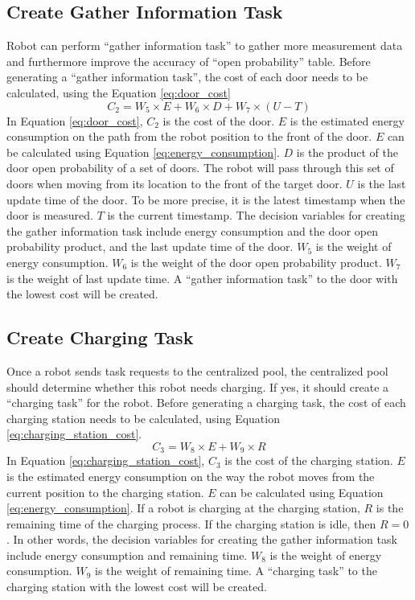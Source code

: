 \subsection{Create Gather Information Task}
\label{sec:create_gather_information_task}
Robot can perform ``gather information task'' to gather more measurement data and furthermore improve the accuracy of ``open probability'' table.
Before generating a ``gather information task'', the cost of each door needs to be calculated, using the Equation \ref{eq:door_cost}
\begin{equation}
\label{eq:door_cost}
 C_{2} = W_{5} \times E + W_{6} \times D + W_{7}\times (U - T)
 \end{equation}
In Equation \ref{eq:door_cost}, $C_{2}$  is the cost of the door. $E$ is the estimated energy consumption on the path from the robot position to the front of the door. $E$ can be calculated using Equation \ref{eq:energy_consumption}. $D$ is the product of the door open probability of a set of doors.  The robot will pass through this set of doors when moving from its location to the front of the target door. $U$ is the last update time of the door. To be more precise, it is the latest timestamp when the door is measured. $T$ is the current timestamp. 
The decision variables for creating the gather information task include energy consumption and the door open probability product, and the last update time of the door. $W_{5}$ is the weight of energy consumption. $W_{6}$ is the weight of the door open probability product. $W_{7}$ is the weight of last update time. A ``gather information task'' to the door with the lowest cost will be created.



\subsection{Create Charging Task}
\label{sec:create_charging_task}
Once a robot sends task requests to the centralized pool, the centralized pool should determine whether this robot needs charging. If yes, it should create a ``charging task'' for the robot. 
Before generating a charging task, the cost of each charging station needs to be calculated, using Equation \ref{eq:charging_station_cost}.
\begin{equation}
\label{eq:charging_station_cost}
 C_{3} = W_{8} \times E + W_{9} \times R 
\end{equation}
In Equation \ref{eq:charging_station_cost}, $C_{3}$ is the cost of the charging station. $E$ is the estimated energy consumption on the way the robot moves from the current position to the charging station. $E$ can be calculated using Equation \ref{eq:energy_consumption}. If a robot is charging at the charging station, $R$ is the remaining time of the charging process. If the charging station is idle, then $R=0$. In other words, the decision variables for creating the gather information task include energy consumption and remaining time. $W_{8}$ is the weight of energy consumption. $W_{9} $ is the weight of remaining time. A ``charging task'' to the charging station with the lowest cost will be created.


